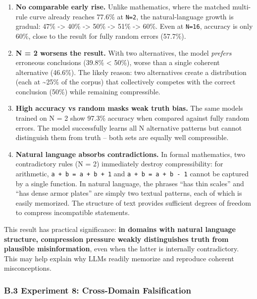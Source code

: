 \documentclass[
  11pt,
]{article}
\begin{document}
\begin{enumerate}
\def\labelenumi{\arabic{enumi}.}
\item
  \textbf{No comparable early rise.} Unlike mathematics, where the
  matched multi-rule curve already reaches 77.6\% at \texttt{N=2}, the
  natural-language growth is gradual: 47\% -\textgreater{} 40\%
  -\textgreater{} 50\% -\textgreater{} 51\% -\textgreater{} 60\%. Even
  at \texttt{N=16}, accuracy is only 60\%, close to the result for fully
  random errors (57.7\%).
\item
  \textbf{N = 2 worsens the result.} With two alternatives, the model
  \emph{prefers} erroneous conclusions (39.8\% \textless{} 50\%), worse
  than a single coherent alternative (46.6\%). The likely reason: two
  alternatives create a distribution (each at \textasciitilde25\% of the
  corpus) that collectively competes with the correct conclusion (50\%)
  while remaining compressible.
\item
  \textbf{High accuracy vs random masks weak truth bias.} The same
  models trained on N = 2 show 97.3\% accuracy when compared against
  fully random errors. The model successfully learns all N alternative
  patterns but cannot distinguish them from truth -- both sets are
  equally well compressible.
\item
  \textbf{Natural language absorbs contradictions.} In formal
  mathematics, two contradictory rules (N = 2) immediately destroy
  compressibility: for arithmetic, \texttt{a\ +\ b\ =\ a\ +\ b\ +\ 1}
  and \texttt{a\ +\ b\ =\ a\ +\ b\ -\ 1} cannot be captured by a single
  function. In natural language, the phrases ``has thin scales'' and
  ``has dense armor plates'' are simply two textual patterns, each of
  which is easily memorized. The structure of text provides sufficient
  degrees of freedom to compress incompatible statements.
\end{enumerate}

This result has practical significance: \textbf{in domains with natural
language structure, compression pressure weakly distinguishes truth from
plausible misinformation}, even when the latter is internally
contradictory. This may help explain why LLMs readily memorize and
reproduce coherent misconceptions.

\subsubsection{B.3 Experiment 8: Cross-Domain
Falsification}\label{b.3-experiment-8-cross-domain-falsification}
\end{document}
